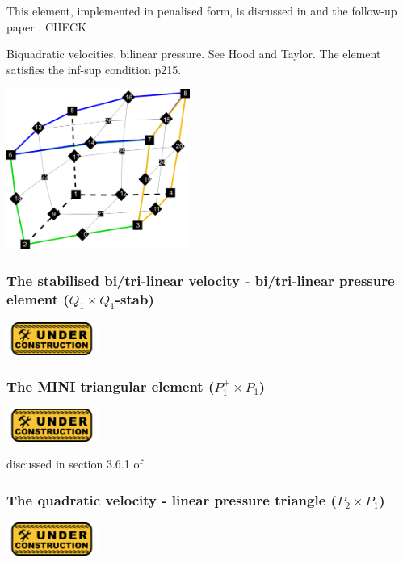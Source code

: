 This element, implemented in penalised form, is discussed in \cite{been79} and the follow-up paper \cite{been80}. CHECK

Biquadratic velocities, bilinear pressure. See Hood and Taylor. The element satisfies the inf-sup condition \cite{hugh}p215. 

\begin{center}
\includegraphics[width=6cm]{images/q2q1/q2numering}
\end{center}


\subsubsection{The stabilised bi/tri-linear velocity -  bi/tri-linear pressure element ($Q_1\times Q_1$-stab)}
\includegraphics[width=3cm]{images/under_construction}

\subsubsection{The MINI triangular element ($P_1^+\times P_1$)}
\includegraphics[width=3cm]{images/under_construction}

discussed in section 3.6.1 of \cite{john16}

\subsubsection{The quadratic velocity - linear pressure triangle ($P_2\times P_1$)}
\includegraphics[width=3cm]{images/under_construction}

